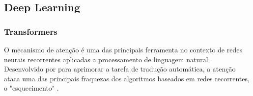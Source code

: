 \subsection{Deep Learning}


\subsubsection{Transformers}
O mecanismo de atenção é uma das principais ferramenta no contexto de redes
neurais recorrentes aplicadas a processamento de linguagem natural.
Desenvolvido por \citet{bahdanau14} para aprimorar a tarefa de tradução
automática, a atenção ataca uma das principais fraquezas dos algoritmos baseados
em redes recorrentes, o "esquecimento" .

